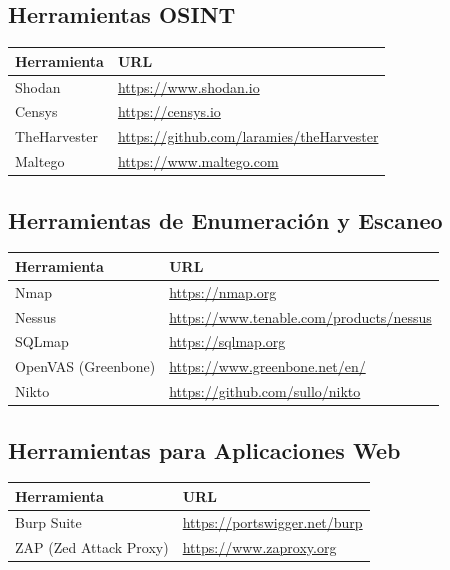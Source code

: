 \documentclass[a4paper, 11pt]{article}
\begin{document}
\subsection*{Herramientas OSINT}
\begin{table}[H]
\centering
\begin{tabular}{|m{5cm}|m{10cm}|}
\hline
\textbf{Herramienta} & \textbf{URL} \\
\hline
Shodan & \url{https://www.shodan.io} \\
\hline
Censys & \url{https://censys.io} \\
\hline
TheHarvester & \url{https://github.com/laramies/theHarvester} \\
\hline
Maltego & \url{https://www.maltego.com} \\
\hline
\end{tabular}
\end{table}

\subsection*{Herramientas de Enumeración y Escaneo}
\begin{table}[H]
\centering
\begin{tabular}{|m{5cm}|m{10cm}|}
\hline
\textbf{Herramienta} & \textbf{URL} \\
\hline
Nmap & \url{https://nmap.org} \\
\hline
Nessus & \url{https://www.tenable.com/products/nessus} \\
\hline
SQLmap & \url{https://sqlmap.org} \\
\hline
OpenVAS (Greenbone) & \url{https://www.greenbone.net/en/} \\
\hline
Nikto & \url{https://github.com/sullo/nikto} \\
\hline
\end{tabular}
\end{table}

\subsection*{Herramientas para Aplicaciones Web}
\begin{table}[H]
\centering
\begin{tabular}{|m{5cm}|m{10cm}|}
\hline
\textbf{Herramienta} & \textbf{URL} \\
\hline
Burp Suite & \url{https://portswigger.net/burp} \\
\hline
ZAP (Zed Attack Proxy) & \url{https://www.zaproxy.org} \\
\hline
\end{tabular}
\end{table}
\end{document}
